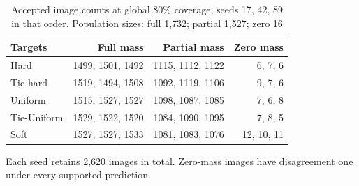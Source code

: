 \begin{table}[t]
\caption{Accepted image counts at global 80\% coverage, seeds 17, 42, 89 in that order. Population sizes: full 1,732; partial 1,527; zero 16}\label{tab:retention}
\centering\begin{tabular}{lrrr}\toprule
Targets & Full mass & Partial mass & Zero mass\\\midrule
Hard & 1499, 1501, 1492 & 1115, 1112, 1122 & 6, 7, 6\\
Tie-hard & 1519, 1494, 1508 & 1092, 1119, 1106 & 9, 7, 6\\
Uniform & 1515, 1527, 1527 & 1098, 1087, 1085 & 7, 6, 8\\
Tie-Uniform & 1529, 1522, 1520 & 1084, 1090, 1095 & 7, 8, 5\\
Soft & 1527, 1527, 1533 & 1081, 1083, 1076 & 12, 10, 11\\
\bottomrule\end{tabular}
Each seed retains 2,620 images in total. Zero-mass images have disagreement one under every supported prediction.
\end{table}
